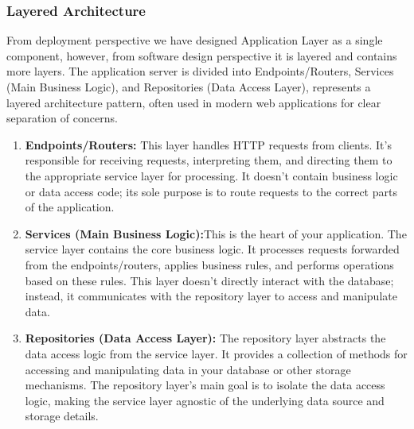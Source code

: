 \subsubsection{Layered Architecture}
From deployment perspective we have designed Application Layer as a single component, however, from software design perspective it is layered and contains more layers. The application server is divided into Endpoints/Routers, Services (Main Business Logic), and Repositories (Data Access Layer), represents a layered architecture pattern, often used in modern web applications for clear separation of concerns. \\
\begin{enumerate}
\item \textbf{Endpoints/Routers:} This layer handles HTTP requests from clients. It's responsible for receiving requests, interpreting them, and directing them to the appropriate service layer for processing. It doesn't contain business logic or data access code; its sole purpose is to route requests to the correct parts of the application.

\item \textbf{Services (Main Business Logic):}This is the heart of your application. The service layer contains the core business logic. It processes requests forwarded from the endpoints/routers, applies business rules, and performs operations based on these rules. This layer doesn't directly interact with the database; instead, it communicates with the repository layer to access and manipulate data.

\item \textbf{Repositories (Data Access Layer): }The repository layer abstracts the data access logic from the service layer. It provides a collection of methods for accessing and manipulating data in your database or other storage mechanisms. The repository layer's main goal is to isolate the data access logic, making the service layer agnostic of the underlying data source and storage details.
\end{enumerate}

